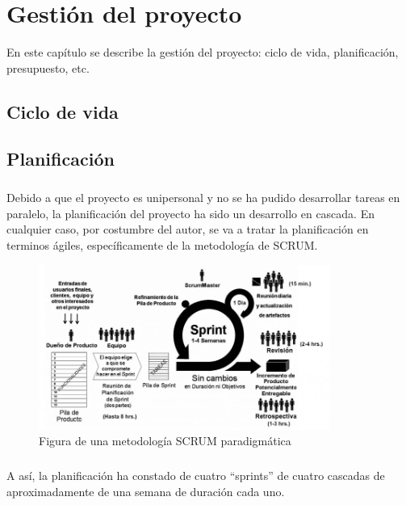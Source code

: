 \chapter{Gestión del proyecto}\label{sec:gestion}

En este capítulo se describe la gestión del proyecto: ciclo de vida, planificación,
presupuesto, etc.

\section{Ciclo de vida}


\section{Planificación}

\paragraph{}Debido a que el proyecto es unipersonal y no se ha pudido desarrollar tareas
en paralelo, la planificación del proyecto ha sido un desarrollo en cascada. En cualquier
caso, por costumbre del autor, se va a tratar la planificación en terminos ágiles,
específicamente de la metodología de SCRUM.

\begin{figure}[H]
    \centering
    \includegraphics[width=0.85\textwidth]{imgs/scrum}
    \caption{Figura de una metodología SCRUM paradigmática}
    \label{fig:scrum}
\end{figure}

\paragraph{}A así, la planificación ha constado de cuatro ``sprints'' de cuatro cascadas
de aproximadamente de una  semana de duración cada uno.

